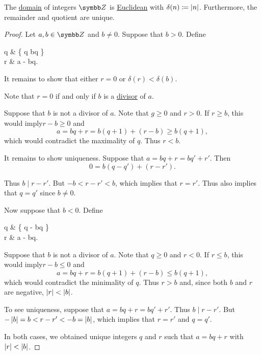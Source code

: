 \begin{proposition}\label{thm:integers_are_euclidean_domain}
  The \hyperref[def:semiring/integral_domain]{domain} of integers \( \BZ \) is \hyperref[def:semiring/euclidean_domain]{Euclidean} with \( \delta(n) \coloneqq \left\vert n \right\vert \). Furthermore, the remainder and quotient are unique.
\end{proposition}
\begin{proof}
  Let \( a, b \in \BZ \) and \( b \neq 0 \). Suppose that \( b > 0 \). Define
  \begin{BreakableAlign*}
    q & \coloneqq \max \{ q \in \BZ \colon bq \leq {} \} \\
    r & \coloneqq a - bq.
  \end{BreakableAlign*}

  It remains to show that either \( r = 0 \) or \( \delta(r) < \delta(b) \).

  Note that \( r = 0 \) if and only if \( b \) is a \hyperref[def:commutative_ring_division]{divisor} of \( a \).

  Suppose that \( b \) is not a divisor of \( a \). Note that \( g \geq 0 \) and \( r > 0 \). If \( r \geq b \), this would imply\LEM \( r - b \geq 0 \) and
  \begin{equation*}
    a = bq + r = b(q + 1) + (r - b) \geq b(q + 1),
  \end{equation*}
  which would contradict the maximality of \( q \). Thus \( r < b \).

  It remains to show uniqueness. Suppose that \( a = bq + r = bq' + r' \). Then
  \begin{equation*}
    0 = b(q - q') + (r - r').
  \end{equation*}

  Thus \( b \mid r - r' \). But \( -b < r - r' < b \), which implies that \( r = r' \). Thus also implies that \( q = q' \) since \( b \neq 0 \).

  Now suppose that \( b < 0 \). Define
  \begin{BreakableAlign*}
    q & \coloneqq \min \{ q \in \BZ \colon - \leq bq \} \\
    r & \coloneqq a - bq.
  \end{BreakableAlign*}

  Suppose that \( b \) is not a divisor of \( a \). Note that \( q \geq 0 \) and \( r < 0 \). If \( r \leq b \), this would imply\LEM \( r - b \leq 0 \) and
  \begin{equation*}
    a = bq + r = b(q + 1) + (r - b) \leq b(q + 1),
  \end{equation*}
  which would contradict the minimality of \( q \). Thus \( r > b \) and, since both \( b \) and \( r \) are negative, \( \left\vert r \right\vert < \left\vert b \right\vert \).

  To see uniqueness, suppose that \( a = bq + r = bq' + r' \). Thus \( b \mid r - r' \). But \( -\left\vert b \right\vert = b < r - r' < -b = \left\vert b \right\vert \), which implies that \( r = r' \) and \( q = q' \).

  In both cases, we obtained unique integers \( q \) and \( r \) such that \( a = bq + r \) with \( \left\vert r \right\vert < \left\vert b \right\vert \).
\end{proof}

